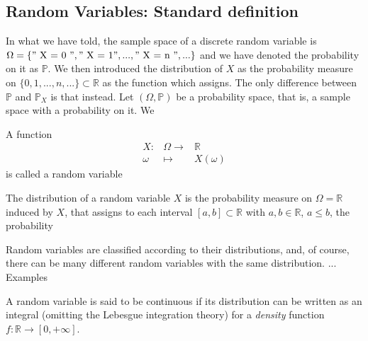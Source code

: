 \subsection{Random Variables: Standard definition}

In what we have told, the sample space of a discrete random variable is $\Omega = \{"\textrm{ X = 0 }", "\textrm{ X = 1}",...,"\textrm{ X = n }",...\}$ and we have denoted the probability on it as $\mathbb P$. We then introduced the distribution of $X$ as the probability measure on $\{0,1,...,n,...\}\subset \mathbb R$ as the function which assigns. The only difference between $\mathbb P$ and $\mathbb P_X$ is that instead. 
Let $(\Omega, \mathbb P)$ be a probability space, that is, a sample space with a probability on it. We
\begin{definition}
A function 
    \begin{equation} \label{e:random_variable_discrete}
        \begin{array}{ccc}
        X: & \Omega  \to & \mathbb R \\
        \omega & \mapsto & X(\omega)
        \end{array}
    \end{equation}
    is called a random variable 
\end{definition}
	\begin{definition}[Distribution ]
		\label{d:distribution}
		The distribution of a random variable $X$ is the probability measure on $\Omega = \mathbb R$ induced by $X$, that assigns to each interval $[a,b]\subset \mathbb R$ with $a, b \in \mathbb R$, $a \leq b$, the probability 
	\end{definition}
	Random variables are classified according to their distributions, and, of course, there can be many different random variables with the same distribution. 
... Examples 
	\begin{definition}
		\label{d:continuous}
		A random variable is said to be continuous if its distribution can be written as an integral (omitting the Lebesgue integration theory)
		for a \emph{density} function $f: \mathbb R \to [0, + \infty]$. 
	\end{definition}
